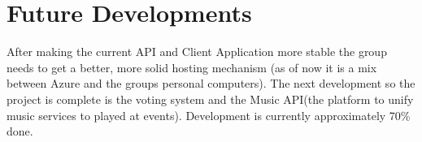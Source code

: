 \section{Future Developments}

After making the current API and Client Application more stable the group needs to get a better, more solid hosting mechanism (as of now it is a mix between Azure and the groups personal computers). The next development so the project is complete is the voting system and the Music API(the platform to unify music services to played at events). Development is currently approximately 70\% done.










